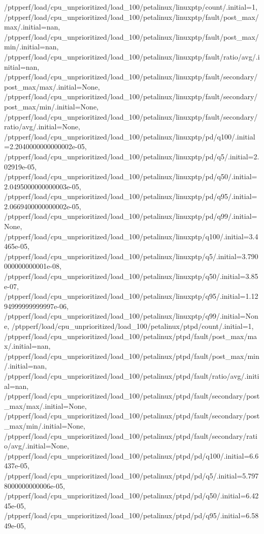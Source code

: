 {    /ptpperf/load/cpu_unprioritized/load_100/petalinux/linuxptp/count/.initial=1,
    /ptpperf/load/cpu_unprioritized/load_100/petalinux/linuxptp/fault/post_max/max/.initial=nan,
    /ptpperf/load/cpu_unprioritized/load_100/petalinux/linuxptp/fault/post_max/min/.initial=nan,
    /ptpperf/load/cpu_unprioritized/load_100/petalinux/linuxptp/fault/ratio/avg/.initial=nan,
    /ptpperf/load/cpu_unprioritized/load_100/petalinux/linuxptp/fault/secondary/post_max/max/.initial=None,
    /ptpperf/load/cpu_unprioritized/load_100/petalinux/linuxptp/fault/secondary/post_max/min/.initial=None,
    /ptpperf/load/cpu_unprioritized/load_100/petalinux/linuxptp/fault/secondary/ratio/avg/.initial=None,
    /ptpperf/load/cpu_unprioritized/load_100/petalinux/linuxptp/pd/q100/.initial=2.2040000000000002e-05,
    /ptpperf/load/cpu_unprioritized/load_100/petalinux/linuxptp/pd/q5/.initial=2.02919e-05,
    /ptpperf/load/cpu_unprioritized/load_100/petalinux/linuxptp/pd/q50/.initial=2.0495000000000003e-05,
    /ptpperf/load/cpu_unprioritized/load_100/petalinux/linuxptp/pd/q95/.initial=2.0669400000000002e-05,
    /ptpperf/load/cpu_unprioritized/load_100/petalinux/linuxptp/pd/q99/.initial=None,
    /ptpperf/load/cpu_unprioritized/load_100/petalinux/linuxptp/q100/.initial=3.4465e-05,
    /ptpperf/load/cpu_unprioritized/load_100/petalinux/linuxptp/q5/.initial=3.790000000000001e-08,
    /ptpperf/load/cpu_unprioritized/load_100/petalinux/linuxptp/q50/.initial=3.85e-07,
    /ptpperf/load/cpu_unprioritized/load_100/petalinux/linuxptp/q95/.initial=1.1294999999999997e-06,
    /ptpperf/load/cpu_unprioritized/load_100/petalinux/linuxptp/q99/.initial=None,
    /ptpperf/load/cpu_unprioritized/load_100/petalinux/ptpd/count/.initial=1,
    /ptpperf/load/cpu_unprioritized/load_100/petalinux/ptpd/fault/post_max/max/.initial=nan,
    /ptpperf/load/cpu_unprioritized/load_100/petalinux/ptpd/fault/post_max/min/.initial=nan,
    /ptpperf/load/cpu_unprioritized/load_100/petalinux/ptpd/fault/ratio/avg/.initial=nan,
    /ptpperf/load/cpu_unprioritized/load_100/petalinux/ptpd/fault/secondary/post_max/max/.initial=None,
    /ptpperf/load/cpu_unprioritized/load_100/petalinux/ptpd/fault/secondary/post_max/min/.initial=None,
    /ptpperf/load/cpu_unprioritized/load_100/petalinux/ptpd/fault/secondary/ratio/avg/.initial=None,
    /ptpperf/load/cpu_unprioritized/load_100/petalinux/ptpd/pd/q100/.initial=6.6437e-05,
    /ptpperf/load/cpu_unprioritized/load_100/petalinux/ptpd/pd/q5/.initial=5.7978000000000006e-05,
    /ptpperf/load/cpu_unprioritized/load_100/petalinux/ptpd/pd/q50/.initial=6.4245e-05,
    /ptpperf/load/cpu_unprioritized/load_100/petalinux/ptpd/pd/q95/.initial=6.5849e-05,
}
